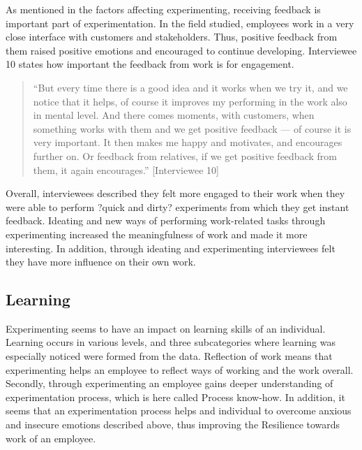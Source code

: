  As mentioned in the factors affecting experimenting, receiving feedback is important part of experimentation. In the field studied, employees work in a very close interface with customers and stakeholders. Thus, positive feedback from them raised positive emotions and encouraged to continue developing. Interviewee 10 states how important the feedback from work is for engagement.
\begin{quote}
``But every time there is a good idea and it works when we try it, and we notice that it helps, of course it improves my performing in the work also in mental level. And there comes moments, with customers, when something works with them and we get positive feedback --- of course it is very important. It then makes me happy and motivates, and encourages further on. Or feedback from relatives, if we get positive feedback from them, it again encourages.'' [Interviewee 10]
\end{quote}
Overall, interviewees described they felt more engaged to their work when they were able to perform ?quick and dirty? experiments from which they get instant feedback. Ideating and new ways of performing work-related tasks through experimenting increased the meaningfulness of work and made it more interesting. In addition, through ideating and experimenting interviewees felt they have more influence on their own work.

\subsection{Learning}
Experimenting seems to have an impact on learning skills of an individual. Learning occurs in various levels, and three subcategories where learning was especially noticed were formed from the data. Reflection of work means that experimenting helps an employee to reflect ways of working and the work overall. Secondly, through experimenting an employee gains deeper understanding of experimentation process, which is here called Process know-how.  In addition, it seems that an experimentation process helps and individual to overcome anxious and insecure emotions described above, thus improving the Resilience towards work of an employee. 

